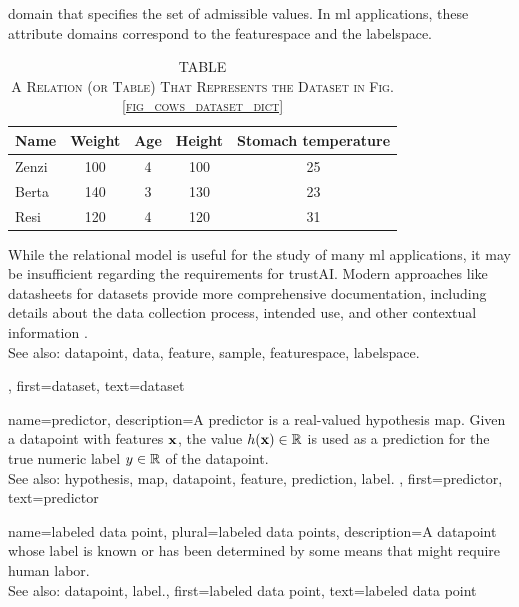 {{		domain that specifies the set of admissible values. In \gls{ml} applications, 
		these attribute domains correspond to the \gls{featurespace} and the \gls{labelspace}.
		\begin{table}[H]
			\caption*{
				\centering 
				\scshape TABLE \thetable \\[0.5ex]
				\scshape A Relation (or Table) That Represents the Dataset in Fig. \ref{fig_cows_dataset_dict} 
			}
			\label{tab:cowdata_dict} 
			\centering
			\begin{tabular}{lcccc}
				\hline
				\textbf{Name} & \textbf{Weight} & \textbf{Age} & \textbf{Height} & \textbf{Stomach temperature} \\
				\hline
				Zenzi & 100 & 4 & 100 & 25 \\
				Berta & 140 & 3 & 130 & 23 \\
				Resi  & 120 & 4 & 120 & 31 \\
				\hline
			\end{tabular}
		\end{table}
 		While the relational \gls{model} is useful for the study of many \gls{ml} applications, 
		it may be insufficient regarding the requirements for \gls{trustAI}. Modern 
 		approaches like datasheets for datasets provide more comprehensive 
 		documentation, including details about the \gls{data} collection process, intended 
 		use, and other contextual information \cite{DatasheetData2021}.
 		\\
		See also: \gls{datapoint}, \gls{data}, \gls{feature}, \gls{sample}, \gls{featurespace}, \gls{labelspace}.},
	first={dataset},
	text={dataset}  
}

{name={predictor},
	description={A predictor is a real-valued \gls{hypothesis} \gls{map}. 
		Given a \gls{datapoint} with \glspl{feature} ${\bf x}$, the value 
		$h({\bf x}) \in \mathbb{R}$ is used as a \gls{prediction} for the true 
		numeric \gls{label} $y \in \mathbb{R}$ of the \gls{datapoint}.
				\\
		See also: \gls{hypothesis}, \gls{map}, \gls{datapoint}, \gls{feature}, \gls{prediction}, \gls{label}. },
	first={predictor},
	text={predictor}  
}

{name={labeled data point}, plural={labeled data points},
 	description={A \gls{datapoint} whose \gls{label} is known or has been determined 
 		by some means that might require human labor.
			\\
		See also: \gls{datapoint}, \gls{label}.},
 	first={labeled data point},
 	text={labeled data point}  
}

